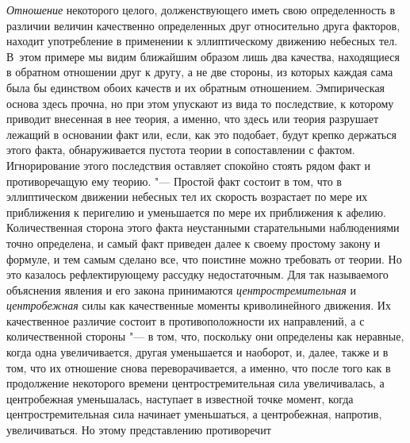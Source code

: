 {\em Отношение} некоторого целого, долженствующего иметь свою определенность в
различии величин качественно определенных друг относительно друга факторов,
находит употребление в применении к эллиптическому движению небесных тел.
В~этом примере мы видим ближайшим образом лишь два качества, находящиеся в
обратном отношении друг к другу, а не две стороны, из которых каждая сама была
бы единством обоих качеств и их обратным отношением. Эмпирическая основа здесь
прочна, но при этом упускают из вида то последствие, к которому приводит
внесенная в нее теория, а именно, что здесь или теория разрушает лежащий в
основании факт или, если, как это подобает, будут крепко держаться этого факта,
обнаруживается пустота теории в сопоставлении с фактом. Игнорирование этого
последствия оставляет спокойно стоять рядом факт и противоречащую ему теорию.
"--- Простой факт состоит в том, что в эллиптическом движении небесных тел их
скорость возрастает по мере их приближения к перигелию и уменьшается по мере их
приближения к афелию. Количественная сторона этого факта неустанными
старательными наблюдениями точно определена, и самый факт приведен далее к
своему простому закону и формуле, и тем самым сделано все, что поистине можно
требовать от теории. Но это казалось рефлектирующему рассудку недостаточным.
Для так называемого объяснения явления и его закона принимаются
{\em центростремительная} и {\em центробежная} силы как качественные моменты
криволинейного движения. Их качественное различие состоит в противоположности
их направлений, а с количественной стороны "--- в том, что, поскольку они
определены как неравные, когда одна увеличивается, другая уменьшается и
наоборот, и, далее, также и в том, что их отношение снова переворачивается, а
именно, что после того как в продолжение некоторого времени центростремительная
сила увеличивалась, а центробежная уменьшалась, наступает в известной точке
момент, когда центростремительная сила начинает уменьшаться, а центробежная,
напротив, увеличиваться. Но этому представлению противоречит
